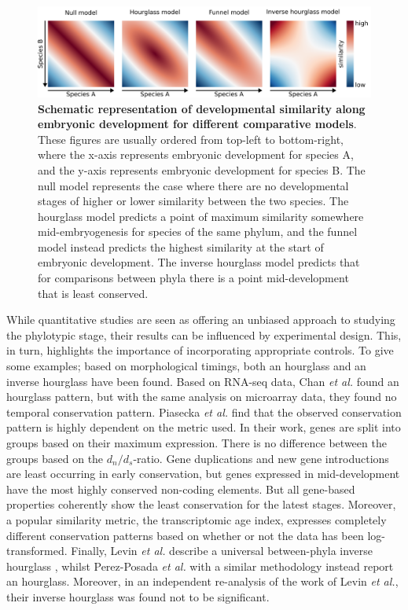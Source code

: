 \begin{figure}[H]
    \includegraphics[width=\linewidth]{ch.hourglass/images/models.png}
    \caption{\textbf{Schematic representation of developmental similarity along embryonic development for different comparative models}. These figures are usually ordered from top-left to bottom-right, where the x-axis represents embryonic development for species A, and the y-axis represents embryonic development for species B. The null model represents the case where there are no developmental stages of higher or lower similarity between the two species. The hourglass model predicts a point of maximum similarity somewhere mid-embryogenesis for species of the same phylum, and the funnel model instead predicts the highest similarity at the start of embryonic development. The inverse hourglass model predicts that for comparisons between phyla there is a point mid-development that is least conserved.}
    \label{fig:models}
\end{figure}

While quantitative studies are seen as offering an unbiased approach to studying the phylotypic stage, their results can be influenced by experimental design. This, in turn, highlights the importance of incorporating appropriate controls. To give some examples; based on morphological timings, both an hourglass\cite{Cordero2020} and an inverse hourglass\cite{OlafRP2003} have been found. Based on RNA-seq data, Chan \textit{et al.} found an hourglass pattern, but with the same analysis on microarray data, they found no temporal conservation pattern\cite{Chan2021}. Piasecka \textit{et al.} find that the observed conservation pattern is highly dependent on the metric used. In their work, genes are split into groups based on their maximum expression. There is no difference between the groups based on the $d_n / d_s$-ratio. Gene duplications and new gene introductions are least occurring in early conservation, but genes expressed in mid-development have the most highly conserved non-coding elements. But all gene-based properties coherently show the least conservation for the latest stages\cite{Piasecka2013}. Moreover, a popular similarity metric, the transcriptomic age index\cite{DomazetLoso2010}, expresses completely different conservation patterns based on whether or not the data has been log-transformed\cite{Piasecka2013}. Finally, Levin \textit{et al.} describe a universal between-phyla inverse hourglass \cite{Levin2016}, whilst Perez-Posada \textit{et al.} with a similar methodology instead report an hourglass\cite{PerezPosada2022}. Moreover, in an independent re-analysis of the work of Levin \textit{et al.}, their inverse hourglass was found not to be significant\cite{Dunn2018}.

